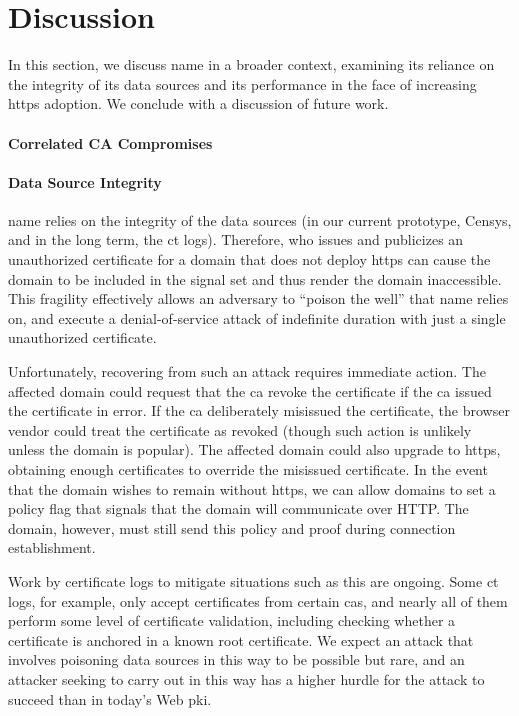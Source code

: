 \section{Discussion}
\label{sec:discussion}

In this section, we discuss \ac{name} in a broader context, examining its
reliance on the integrity of its data sources and its performance in
the face of increasing \ac{https} adoption. We conclude with a discussion of
future work.

\paragraph{Correlated CA Compromises}

\paragraph{Data Source Integrity}
\ac{name} relies on the integrity of the data sources (in our current prototype,
Censys, and in the long term, the \ac{ct} logs). Therefore,  who issues
and publicizes an unauthorized certificate for a domain that does not deploy
\ac{https} can cause the domain to be included in the signal set and thus render
the domain inaccessible. This fragility effectively allows an adversary to
``poison the well'' that \ac{name} relies on, and execute a denial-of-service
attack of indefinite duration with just a single unauthorized certificate.

Unfortunately, recovering from such an attack requires immediate action. The
affected domain could request that the \ac{ca} revoke the certificate if the
\ac{ca} issued the certificate in error. If the \ac{ca} deliberately misissued
the certificate, the browser vendor could treat the certificate as revoked
(though such action is unlikely unless the domain is popular). The affected
domain could also upgrade to \ac{https}, obtaining enough certificates to
override the misissued certificate. In the event that the domain wishes to
remain without \ac{https}, we can allow domains to set a policy flag that
signals that the domain will communicate over HTTP. The domain, however, must
still send this policy and proof during connection establishment.

Work by certificate logs to mitigate situations such as this are ongoing. Some
\ac{ct} logs, for example, only accept certificates from certain \acp{ca}, and
nearly all of them perform some level of certificate validation, including
checking whether a certificate is anchored in a known root certificate. We
expect an attack that involves poisoning data sources in this way to be possible
but rare, and an attacker seeking to carry out  in this way has a
higher hurdle for the attack to succeed than in today's Web \ac{pki}.

